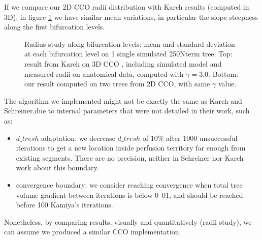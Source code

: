 \documentclass[a4paper, 11pt]{article} %
\begin{document}
If we compare our 2D CCO radii distribution with Karch results (computed in 3D), in figure \ref{fig:Karch radii study} we have similar mean variations, in particular the slope steepness along the first bifurcation levels.
\begin{figure}[htbp]
\centering
{}
\caption{Radius study along bifurcation levels: mean and standard deviation at each bifurcation level on 1 single simulated 250Nterm tree. Top: result from Karch on 3D CCO \cite{karch1999three}, including simulated model and measured radii on anatomical data, computed with $\gamma = 3.0$. Bottom: our result computed on two trees from 2D CCO, with same $\gamma$ value.}
\label{fig:Karch radii study}
\end{figure}

The algorithm we implemented might not be exactly the same as Karch and Schreiner,due to internal parameters that were not detailed in their work, such as:
\begin{itemize}
\item $d\_tresh$ adaptation: we decrease $d\_tresh$ of $10\%$ after 1000 unsuccessful iterations to get a new location inside perfusion territory far enough from existing segments. There are no precision, neither in Schreiner nor Karch work about this boundary.
\item convergence boundary: we consider reaching convergence when total tree volume gradient between iterations is below \unit{0.01}{\milli\cubic\meter}, and should be reached before 100 Kamiya's iterations.
\end{itemize}
Nonetheless, by comparing results, visually and quantitatively (radii study), we can assume we produced a similar CCO implementation.
\end{document}

